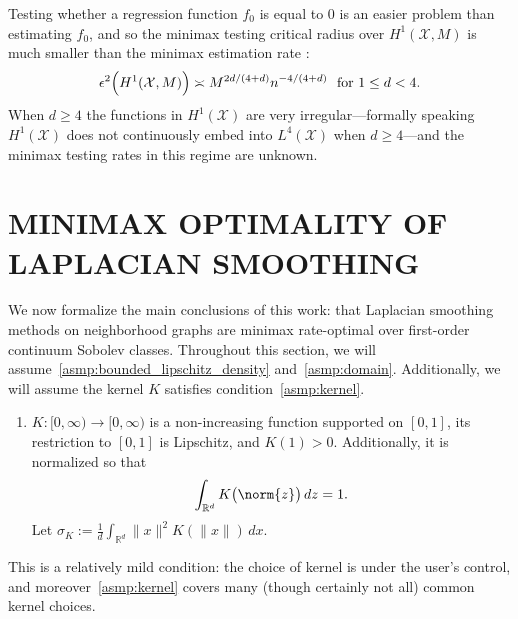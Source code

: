 \documentclass[twoside]{article}
\newcommand{\Reals}{\mathbb{R}}
\newcommand{\1}{\mathbf{1}}
\newcommand{\Rd}{\Reals^d}
\newcommand{\Xset}{\mathcal{X}}
\newcommand{\Leb}{L}
\theoremstyle{definition}
\theoremstyle{remark}
\begin{document}
Testing whether a regression function $f_0$ is equal to $0$ is an easier problem than estimating $f_0$, and so the minimax testing critical radius over $H^1(\Xset,M)$ is much smaller than the minimax estimation rate \citep{ingster2009}:
\begin{equation}
\label{eqn:sobolev_space_testing_critical_radius}
\epsilon^2\Bigl(H^1(\Xset,M)\Bigr) \asymp M^{2d/(4 + d)}n^{-4/(4 + d)}~~\textrm{for $1 \leq d < 4$.}
\end{equation}
When $d \geq 4$ the functions in $H^1(\Xset)$ are very irregular---formally speaking $H^1(\Xset)$ does not continuously embed into $\Leb^4(\Xset)$ when $d \geq 4$---and the minimax testing rates in this regime are unknown. 

\section{MINIMAX OPTIMALITY OF LAPLACIAN SMOOTHING}
\label{sec:minimax_optimal_laplacian_smoothing}

We now formalize the main conclusions of this work: that Laplacian smoothing methods on neighborhood graphs are minimax rate-optimal over first-order continuum Sobolev classes. Throughout this section, we will assume~\ref{asmp:bounded_lipschitz_density} and~\ref{asmp:domain}. Additionally, we will assume the kernel $K$ satisfies condition~\ref{asmp:kernel}.
\begin{enumerate}[label=(K\arabic*)]
	\item
	\label{asmp:kernel}
	$K:[0,\infty) \to [0,\infty)$ is a non-increasing function supported on $[0,1]$, its restriction to $[0,1]$ is Lipschitz, and $K(1) > 0$. Additionally, it is normalized so that
	\begin{equation*}
	\int_{\Reals^d} K\bigl(\norm{z}\bigr) \,dz = 1.
	\end{equation*}
	Let $\sigma_K := \frac{1}{d} \int_{\Rd} \|x\|^2 K(\|x\|) \,dx$.
\end{enumerate}
This is a relatively mild condition: the choice of kernel is under the user's control, and moreover~\ref{asmp:kernel} covers many (though certainly not all) common kernel choices.
\end{document}
